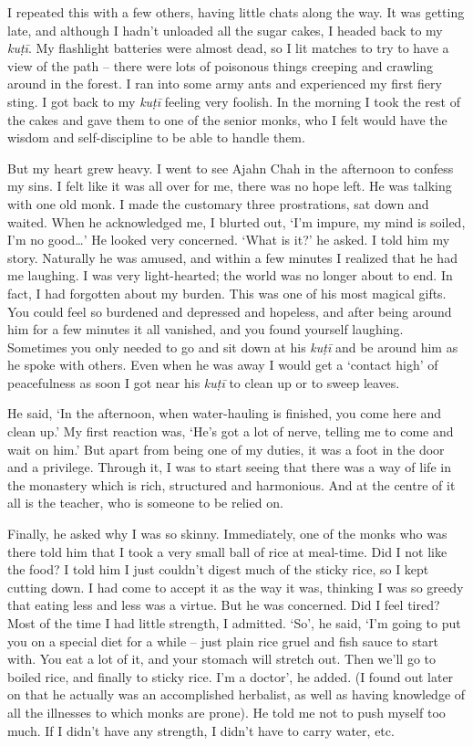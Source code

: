 I repeated this with a few others, having little chats along the way. It
was getting late, and although I hadn't unloaded all the sugar cakes, I
headed back to my \emph{kuṭī}. My flashlight batteries were almost dead, 
so I lit matches to try to have a view of the path -- there were lots of
poisonous things creeping and crawling around in the forest. I ran into
some army ants and experienced my first fiery sting. I got back to my
\emph{kuṭī} feeling very foolish. In the morning I took the rest of the
cakes and gave them to one of the senior monks, who I felt would have
the wisdom and self-discipline to be able to handle them. 

But my heart grew heavy. I went to see Ajahn Chah in the afternoon to
confess my sins. I felt like it was all over for me, there was no hope
left. He was talking with one old monk. I made the customary three
prostrations, sat down and waited. When he acknowledged me, I blurted
out, `I'm impure, my mind is soiled, I'm no good\ldots{}' He looked very
concerned. `What is it?' he asked. I told him my story. Naturally he was
amused, and within a few minutes I realized that he had me laughing. I
was very light-hearted; the world was no longer about to end. In fact, I
had forgotten about my burden. This was one of his most magical gifts. 
You could feel so burdened and depressed and hopeless, and after being
around him for a few minutes it all vanished, and you found yourself
laughing. Sometimes you only needed to go and sit down at his
\emph{kuṭī} and be around him as he spoke with others. Even when he was
away I would get a `contact high' of peacefulness as soon I got near his
\emph{kuṭī} to clean up or to sweep leaves. 

He said, `In the afternoon, when water-hauling is finished, you come
here and clean up.' My first reaction was, `He's got a lot of nerve, 
telling me to come and wait on him.' But apart from being one of my
duties, it was a foot in the door and a privilege. Through it, I was to
start seeing that there was a way of life in the monastery which is
rich, structured and harmonious. And at the centre of it all is the
teacher, who is someone to be relied on. 

Finally, he asked why I was so skinny. Immediately, one of the monks who
was there told him that I took a very small ball of rice at meal-time. 
Did I not like the food? I told him I just couldn't digest much of the
sticky rice, so I kept cutting down. I had come to accept it as the way
it was, thinking I was so greedy that eating less and less was a virtue. 
But he was concerned. Did I feel tired? Most of the time I had little
strength, I admitted. `So', he said, `I'm going to put you on a special
diet for a while -- just plain rice gruel and fish sauce to start with. 
You eat a lot of it, and your stomach will stretch out. Then we'll go to
boiled rice, and finally to sticky rice. I'm a doctor', he added. (I
found out later on that he actually was an accomplished herbalist, as
well as having knowledge of all the illnesses to which monks are prone). 
He told me not to push myself too much. If I didn't have any strength, I
didn't have to carry water, etc. 

